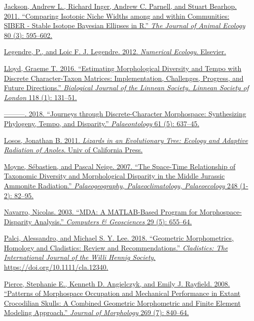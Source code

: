 \href{http://paperpile.com/b/sTGYvp/PwyQ}{Jackson, Andrew L., Richard
Inger, Andrew C. Parnell, and Stuart Bearhop. 2011. ``Comparing Isotopic
Niche Widths among and within Communities: SIBER - Stable Isotope
Bayesian Ellipses in R.'' \emph{The Journal of Animal Ecology} 80 (3):
595--602.}

\href{http://paperpile.com/b/sTGYvp/oFiP}{Legendre, P., and Loic F. J.
Legendre. 2012. \emph{Numerical Ecology}. Elsevier.}

\href{http://paperpile.com/b/sTGYvp/bCsU}{Lloyd, Graeme T. 2016.
``Estimating Morphological Diversity and Tempo with Discrete
Character-Taxon Matrices: Implementation, Challenges, Progress, and
Future Directions.'' \emph{Biological Journal of the Linnean Society.
Linnean Society of London} 118 (1): 131--51.}

\href{http://paperpile.com/b/sTGYvp/53SJ}{---------. 2018. ``Journeys
through Discrete-Character Morphospace: Synthesizing Phylogeny, Tempo,
and Disparity.'' \emph{Palaeontology} 61 (5): 637--45.}

\href{http://paperpile.com/b/sTGYvp/dJHu}{Losos, Jonathan B. 2011.
\emph{Lizards in an Evolutionary Tree: Ecology and Adaptive Radiation of
Anoles}. Univ of California Press.}

\href{http://paperpile.com/b/sTGYvp/aVVj}{Moyne, Sébastien, and Pascal
Neige. 2007. ``The Space-Time Relationship of Taxonomic Diversity and
Morphological Disparity in the Middle Jurassic Ammonite Radiation.''
\emph{Palaeogeography, Palaeoclimatology, Palaeoecology} 248 (1-2):
82--95.}

\href{http://paperpile.com/b/sTGYvp/EmTR}{Navarro, Nicolas. 2003. ``MDA:
A MATLAB-Based Program for Morphospace-Disparity Analysis.''
\emph{Computers \& Geosciences} 29 (5): 655--64.}

\href{http://paperpile.com/b/sTGYvp/yO2t}{Palci, Alessandro, and Michael
S. Y. Lee. 2018. ``Geometric Morphometrics, Homology and Cladistics:
Review and Recommendations.'' \emph{Cladistics: The International
Journal of the Willi Hennig Society}.
https://doi.org/}\href{http://dx.doi.org/10.1111/cla.12340}{10.1111/cla.12340}\href{http://paperpile.com/b/sTGYvp/yO2t}{.}

\href{http://paperpile.com/b/sTGYvp/tSIy}{Pierce, Stephanie E., Kenneth
D. Angielczyk, and Emily J. Rayfield. 2008. ``Patterns of Morphospace
Occupation and Mechanical Performance in Extant Crocodilian Skulls: A
Combined Geometric Morphometric and Finite Element Modeling Approach.''
\emph{Journal of Morphology} 269 (7): 840--64.}

